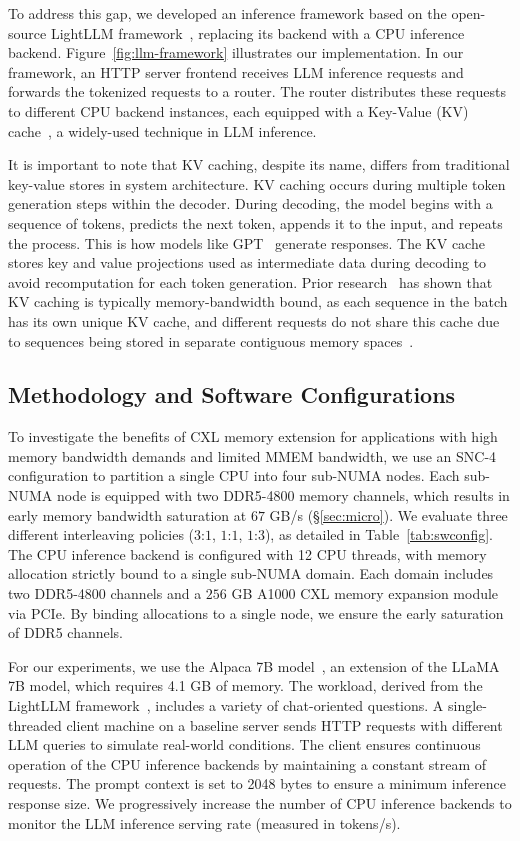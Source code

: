 To address this gap, we developed an inference framework based on the open-source LightLLM framework~\cite{lightllm}, replacing its backend with a CPU inference backend. Figure~\ref{fig:llm-framework} illustrates our implementation. In our framework, an HTTP server frontend receives LLM inference requests and forwards the tokenized requests to a router. The router distributes these requests to different CPU backend instances, each equipped with a Key-Value (KV) cache~\cite{kvcache}, a widely-used technique in LLM inference.

It is important to note that KV caching, despite its name, differs from traditional key-value stores in system architecture. KV caching occurs during multiple token generation steps within the decoder. During decoding, the model begins with a sequence of tokens, predicts the next token, appends it to the input, and repeats the process. This is how models like GPT~\cite{gpt4} generate responses. The KV cache stores key and value projections used as intermediate data during decoding to avoid recomputation for each token generation. Prior research~\cite{kvcache} has shown that KV caching is typically memory-bandwidth bound, as each sequence in the batch has its own unique KV cache, and different requests do not share this cache due to sequences being stored in separate contiguous memory spaces~\cite{vllmpaper}.

\subsection{Methodology and Software Configurations}
To investigate the benefits of CXL memory extension for applications with high memory bandwidth demands and limited MMEM bandwidth, we use an SNC-4 configuration to partition a single CPU into four sub-NUMA nodes. Each sub-NUMA node is equipped with two DDR5-4800 memory channels, which results in early memory bandwidth saturation at $67$ GB/s (\S\ref{sec:micro}). We evaluate three different interleaving policies ($3$:$1$, $1$:$1$, $1$:$3$), as detailed in Table~\ref{tab:swconfig}. The CPU inference backend is configured with 12 CPU threads, with memory allocation strictly bound to a single sub-NUMA domain. Each domain includes two DDR5-4800 channels and a $256$ GB A1000 CXL memory expansion module via PCIe. By binding allocations to a single node, we ensure the early saturation of DDR5 channels. 

For our experiments, we use the Alpaca 7B model~\cite{alpaca}, an extension of the LLaMA 7B model, which requires 4.1 GB of memory. The workload, derived from the LightLLM framework~\cite{lightllm}, includes a variety of chat-oriented questions. A single-threaded client machine on a baseline server sends HTTP requests with different LLM queries to simulate real-world conditions. The client ensures continuous operation of the CPU inference backends by maintaining a constant stream of requests. The prompt context is set to 2048 bytes to ensure a minimum inference response size. We progressively increase the number of CPU inference backends to monitor the LLM inference serving rate (measured in tokens/s).

